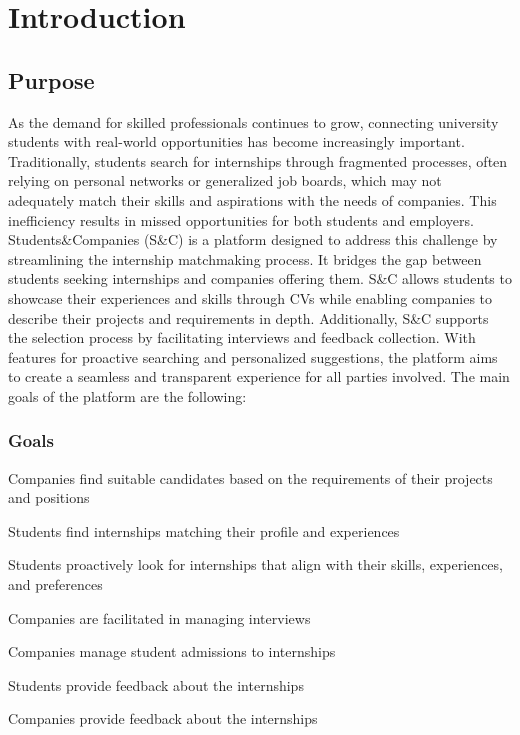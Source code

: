 \chapter{Introduction}
\label{ch:intro}

\section{Purpose }
As the demand for skilled professionals continues to grow, connecting university students with real-world opportunities has become increasingly important. Traditionally, students search for internships through fragmented processes, often relying on personal networks or generalized job boards, which may not adequately match their skills and aspirations with the needs of companies. This inefficiency results in missed opportunities for both students and employers.\newline
Students\&Companies (S\&C) is a platform designed to address this challenge by streamlining the internship matchmaking process. It bridges the gap between students seeking internships and companies offering them. S\&C allows students to showcase their experiences and skills through CVs while enabling companies to describe their projects and requirements in depth.\newline
Additionally, S\&C supports the selection process by facilitating interviews and feedback collection. With features for proactive searching and personalized suggestions, the platform aims to create a seamless and transparent experience for all parties involved.
The main goals of the platform are the following:

\subsection{Goals }
\begin{enumerate}[label={[G\arabic{enumi}]}]
    \item Companies find suitable candidates based on the requirements of their projects and positions
    \item Students find internships matching their profile and experiences
    \item Students proactively look for internships that align with their skills, experiences, and preferences
    \item Companies are facilitated in managing interviews
    \item Companies manage student admissions to internships
    \item Students provide feedback about the internships
    \item Companies provide feedback about the internships
\end{enumerate}

